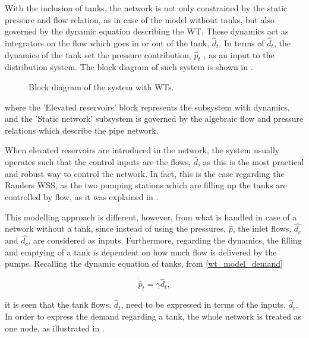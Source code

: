 With the inclusion of tanks, the network is not only constrained by the static pressure and flow relation, as in case of the model without tanks, but also governed by the dynamic equation describing the WT. These dynamics act as integrators on the flow which goes in or out of the tank, $\hat{d}_t$. In terms of $\hat{d}_t$, the dynamics of the tank set the pressure contribution, $\hat{p}_t$ , as an input to the distribution system. The block diagram of such system is shown in .

\begin{figure}[H]
\centering
 
\caption{Block diagram of the system with WTs.}
\label{fig:WT_system_blockdiagram}
\end{figure}

where the 'Elevated reservoirs' block represents the subsystem with dynamics, and the 'Static network' subsystem is governed by the algebraic flow and pressure relations which describe the pipe network. 

When elevated reservoirs are introduced in the network, the system usually operates such that the control inputs are the flows, $\hat{d}$, as this is the most practical and robust way to control the network. In fact, this is the case regarding the Randers WSS, as the two pumping stations which are filling up the tanks are controlled by flow, as it was explained in . 

This modelling approach is different, however,  from what is handled in case of a network without a tank, since instead of using the pressures, $\hat{p}$, the inlet flows, $\hat{d_c}$ and $\hat{d_c}$, are considered as inputs. Furthermore, regarding the dynamics, the filling and emptying of a tank is dependent on how much flow is delivered by the pumps. Recalling the dynamic equation of tanks, from \eqref{wt_model_demand}

\begin{equation}
\label{wt_model_demand}
\dot{\hat{p}}_t = \gamma \hat{d}_t,
\end{equation}

it is seen that the tank flows, $\hat{d}_t$, need to be expressed in terms of the inputs, $\hat{d}_c$. In order to express the demand regarding a tank, the whole network is treated as one node, as illustrated in . 

